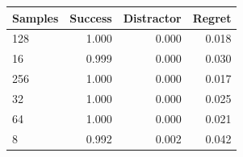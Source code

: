 \begin{tabular}{lrrr}
\toprule
Samples & Success & Distractor & Regret\\
\midrule
128 & 1.000 & 0.000 & 0.018\\
16 & 0.999 & 0.000 & 0.030\\
256 & 1.000 & 0.000 & 0.017\\
32 & 1.000 & 0.000 & 0.025\\
64 & 1.000 & 0.000 & 0.021\\
8 & 0.992 & 0.002 & 0.042\\
\bottomrule
\end{tabular}

